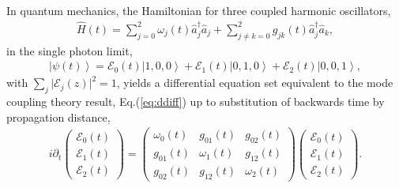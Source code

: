 \documentclass[9pt,twocolumn,twoside]{osajnl}
\begin{document}
In quantum mechanics, the Hamiltonian for three coupled harmonic oscillators, 
\begin{eqnarray}
	\hat{H}(t) = \sum_{j=0}^{2} \omega_j(t) \hat{a}^{\dagger}_j \hat{a}_{j} + \sum_{j\neq k=0}^{2} g_{jk}(t) \hat{a}^{\dagger}_j \hat{a}_k,
\end{eqnarray}
in the single photon limit,
\begin{eqnarray}
	\left\vert \psi(t) \right\rangle = \mathcal{E}_{0}(t) \left\vert 1, 0, 0 \right\rangle  +
	\mathcal{E}_{1}(t) \left\vert 0,1,0 \right\rangle + \mathcal{E}_{2}(t) \left\vert 0,0,1 \right\rangle,
\end{eqnarray}
with $ \sum_{j} \vert \mathcal{E}_{j}(z) \vert^2 = 1$, yields a differential equation set equivalent to the mode coupling theory result, Eq.(\ref{eq:ddiff}) up to substitution of backwards time by propagation distance,
\begin{eqnarray}
	i \partial_t	
	\left( \begin{array}{c} 
		\mathcal{E}_{0}(t) \\
		\mathcal{E}_{1}(t) \\
		\mathcal{E}_{2}(t)
	\end{array} \right) =
	\left( \begin{array}{ccc} 
		\omega_{0}(t)  & g_{01}(t) & g_{02}(t) \\
		g_{01}(t) & \omega_{1}(t) & g_{12}(t) \\
		g_{02}(t) & g_{12}(t) & \omega_{2}(t)
	\end{array} \right)
	\left( \begin{array}{c} 
		\mathcal{E}_{0}(t) \\
		\mathcal{E}_{1}(t) \\
		\mathcal{E}_{2}(t)
	\end{array} \right) .
\end{eqnarray}
\end{document}
